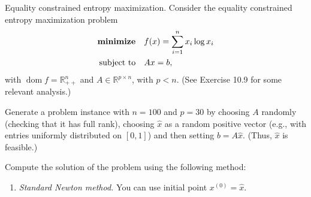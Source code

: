 \documentclass[11pt,letter,notitlepage]{article}
\DeclareMathOperator*{\minimize}{\bf minimize}
\theoremstyle{definition}
\begin{document}
\newpage

\begin{exercise}
Equality constrained entropy maximization. Consider the equality constrained entropy maximization problem
\[
\begin{aligned}
\minimize \quad & f(x) = \sum_{i=1}^n x_i \log x_i \\
\text{subject to} \quad & Ax = b,
\end{aligned}
\]
with $\operatorname{dom} f = \mathbb{R}_{++}^n$ and $A \in \mathbb{R}^{p \times n}$, with $p < n$. (See Exercise 10.9 for some relevant analysis.)

Generate a problem instance with $n = 100$ and $p = 30$ by choosing $A$ randomly (checking that it has full rank), choosing $\hat{x}$ as a random positive vector (e.g., with entries uniformly distributed on $[0,1]$) and then setting $b = A\hat{x}$. (Thus, $\hat{x}$ is feasible.)

Compute the solution of the problem using the following method:

\begin{enumerate}[label=(\alph*)]
    \item \textit{Standard Newton method.} You can use initial point $x^{(0)} = \hat{x}$.
\end{enumerate}
\end{exercise}

\newpage
\end{document}
